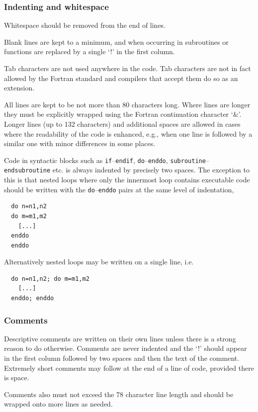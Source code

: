 \documentclass[\mydriver,12pt,twoside,notitlepage,a4paper]{article}
\newcommand{\code}[1]{\texttt{#1}}
\begin{document}
\subsubsection{Indenting and whitespace}

Whitespace should be removed from the end of lines.

Blank lines are kept to a minimum, and when occurring in subroutines
or functions are replaced by a single `!' in the first column.

Tab characters are not used anywhere in the code.  Tab characters are
not in fact allowed by the Fortran standard and compilers that accept
them do so as an extension.

All lines are kept to be not more than 80 characters long.
Where lines are longer they must be explicitly wrapped using the
Fortran continuation character `\&'.
Longer lines (up to 132 characters) and additional spaces are allowed
in cases where the readability of the code is enhanced, e.g., when one
line is followed by a similar one with minor differences in some places.

Code in syntactic blocks such as \code{if}--\code{endif}, \code{do}--\code{enddo},
\code{subroutine}--\code{endsubroutine} etc. is always indented by precisely two spaces.
The exception to this is that nested loops where only the innermost loop
contains executable code should be written with the \code{do}--\code{enddo}
pairs at the same level of indentation,
\begin{verbatim}
  do n=n1,n2
  do m=m1,m2
    [...]
  enddo
  enddo
\end{verbatim}
Alternatively nested loops may be written on a single line, i.e.
\begin{verbatim}
  do n=n1,n2; do m=m1,m2
    [...]
  enddo; enddo
\end{verbatim}

\subsubsection{Comments}

Descriptive comments are written on their own lines unless there is a strong
reason to do otherwise. Comments are never indented and the `!' should appear
in the first column followed by two spaces and then the text of the comment.
Extremely short comments may follow at the end of a line of code, provided
there is space.

Comments also must not exceed the 78 character line length and should be
wrapped onto more lines as needed.
\end{document}
